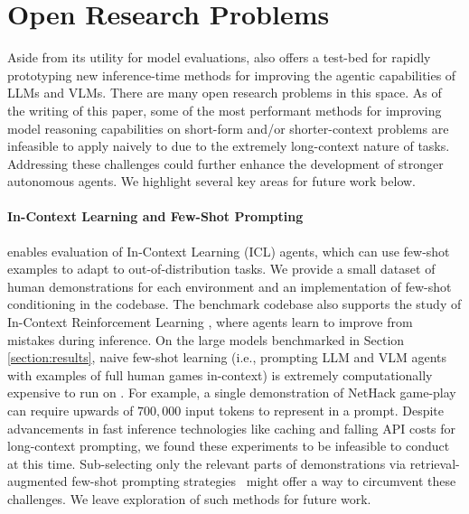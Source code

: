 \section{Open Research Problems}

\label{reserch_problems}






Aside from its utility for model evaluations, \our{} also offers a test-bed for rapidly prototyping new inference-time methods for improving the agentic capabilities of LLMs and VLMs. There are many open research problems in this space. As of the writing of this paper, some of the most performant methods for improving model reasoning capabilities on short-form and/or shorter-context problems are infeasible to apply naively to \our{} due to the extremely long-context nature of tasks. Addressing these challenges could further enhance the development of stronger autonomous agents. We highlight several key areas for future work below.

\paragraph{In-Context Learning and Few-Shot Prompting} \our{} enables evaluation of In-Context Learning (ICL) agents, which can use few-shot examples to adapt to out-of-distribution tasks. We provide a small dataset of human demonstrations for each environment and an implementation of few-shot conditioning in the \our{} codebase. The benchmark codebase also supports the study of In-Context Reinforcement Learning \citep{lee2024supervised, laskin2022context, lin2023transformers}, where agents learn to improve from mistakes during inference. On the large models benchmarked in Section \ref{section:results}, naive few-shot learning (i.e., prompting LLM and VLM agents with examples of full human games in-context) is extremely computationally expensive to run on \our{}. For example, a single demonstration of NetHack game-play can require upwards of $700,000$ input tokens to represent in a prompt. Despite advancements in fast inference technologies like caching and falling API costs for long-context prompting, we found these experiments to be infeasible to conduct at this time. Sub-selecting only the relevant parts of demonstrations via retrieval-augmented few-shot prompting strategies~\citep{lewis2020retrieval} might offer a way to circumvent these challenges. We leave exploration of such methods for future work.

